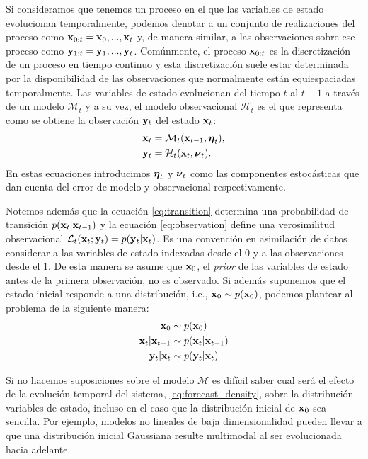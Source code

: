 Si consideramos que tenemos un proceso en el que las variables de estado evolucionan temporalmente, podemos denotar a un conjunto de realizaciones del proceso como $\mathbf{x}_{0:t} = \mathbf{x}_0, ..., \mathbf{x}_t$ y, de manera similar, a las observaciones sobre ese proceso como $\mathbf{y}_{1:t} = \mathbf{y}_1, ..., \mathbf{y}_t$. Comúnmente, el proceso $\mathbf{x}_{0:t}$ es la discretización de un proceso en tiempo continuo y esta discretización suele estar determinada por la disponibilidad de las observaciones que normalmente están equiespaciadas temporalmente. Las variables de estado evolucionan del tiempo $t$ al $t+1$ a través de un modelo $\mathcal{M}_t$ y a su vez, el modelo observacional $\mathcal{H}_t$ es el que representa como se obtiene la observación $\mathbf{y}_t$ del estado $\mathbf{x}_t$: 
\begin{align}
    \mathbf{x}_t &= \mathcal M_{t} (\mathbf{x}_{t-1}, \mbox{\boldmath$ \eta $}_t), \label{eq:transition} \\
    \mathbf{y}_t &= \mathcal H_{t} (\mathbf{x}_t, \mbox{\boldmath$ \nu $}_t). \label{eq:observation}
\end{align}
En estas ecuaciones introducimos $\mbox{\boldmath$ \eta $}_t$ y $\mbox{\boldmath$ \nu $}_t$ como las componentes estocásticas que dan cuenta del error de modelo y observacional respectivamente.

Notemos además que la ecuación \ref{eq:transition} determina una probabilidad de transición $p(\mathbf{x}_t | \mathbf{x}_{t-1})$ y la ecuación \ref{eq:observation} define una verosimilitud observacional $\mathcal{L}_t(\mathbf{x}_t ; \mathbf{y}_t) = p(\mathbf{y}_t | \mathbf{x}_t)$. Es una convención en asimilación de datos considerar a las variables de estado indexadas desde el $0$ y a las observaciones desde el $1$. De esta manera se asume que $\mathbf{x}_0$, el \textit{prior} de las variables de estado antes de la primera observación, no es observado. Si además suponemos que el estado inicial responde a una distribución, i.e.,  $\mathbf{x}_0 \sim p(\mathbf{x}_0)$, podemos plantear al problema de la siguiente manera:
\begin{align}
    \mathbf{x}_0 &\sim p(\mathbf{x}_0) \\
    \mathbf{x}_t | \mathbf{x}_{t-1} &\sim p(\mathbf{x}_t | \mathbf{x}_{t-1}) \label{eq:forecast_density}\\
    \mathbf{y}_t | \mathbf{x}_t &\sim p(\mathbf{y}_t | \mathbf{x}_t)
\end{align}

Si no hacemos suposiciones sobre el modelo $\mathcal{M}$ es difícil saber cual será el efecto de la evolución temporal del sistema, \ref{eq:forecast_density}, sobre la distribución variables de estado, incluso en el caso que la distribución inicial de $\mathbf{x}_0$ sea sencilla. Por ejemplo, modelos no lineales de baja dimensionalidad pueden llevar a que una distribución inicial Gaussiana resulte multimodal al ser evolucionada hacia adelante. 

